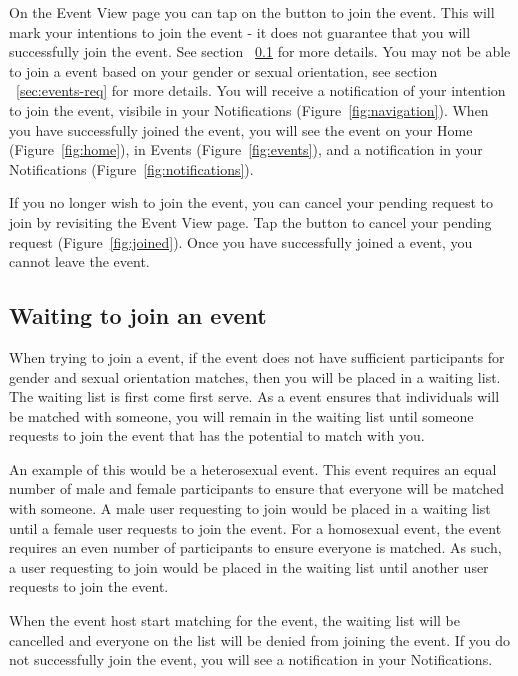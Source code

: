\documentclass[a4paper,11pt,titlepage]{scrartcl}
\newcommand{\textui}[1]{{\fontfamily{pag}\selectfont#1}}
\newcommand{\textaction}[1]{{\fontfamily{cmtt}\selectfont#1}}
\newcommand{\Screenshot}[1]{\textui{#1}}
\newcommand{\action}[1]{\textaction{#1}}
\begin{document}
On the \Screenshot{Event View} page you can tap on the  button to join the event. This will mark your intentions to join the event - it does not guarantee that you will successfully join the event. See section ~\ref{sec:events-wait} for more details.   You may not be able to join a event based on your gender or sexual orientation, see section ~\ref{sec:events-req} for more details. You will receive a notification of your intention to join the event, visibile in your \Screenshot{Notifications} (Figure~\ref{fig:navigation}).   When you have successfully joined the event, you will see the event on your \Screenshot{Home} (Figure~\ref{fig:home}), in \Screenshot{Events} (Figure~\ref{fig:events}), and a notification in your \Screenshot{Notifications} (Figure~\ref{fig:notifications}).  

If you no longer wish to join the event, you can cancel your pending request to join by revisiting the \Screenshot{Event View} page.  \action{Tap} the  button to cancel your pending request (Figure~\ref{fig:joined}).  Once you have successfully joined a event, you cannot leave the event.

\subsection{Waiting to join an event}
\label{sec:events-wait}
When trying to join a event, if the event does not have sufficient participants for gender and sexual orientation matches, then you will be placed in a waiting list.  The waiting list is first come first serve.  As a event ensures that individuals will be matched with someone, you will remain in the waiting list until someone requests to join the event that has the potential to match with you. 

An example of this would be a heterosexual event.  This event requires an equal number of male and female participants to ensure that everyone will be matched with someone.  A male user requesting to join would be placed in a waiting list until a female user requests to join the event.  For a homosexual event, the event requires an even number of participants to ensure everyone is matched.  As such, a user requesting to join would be placed in the waiting list until another user requests to join the event.

When the event host start matching for the event, the waiting list will be cancelled and everyone on the list will be denied from joining the event.  If you do not successfully join the event, you will see a notification in your \Screenshot{Notifications}.
\end{document}
